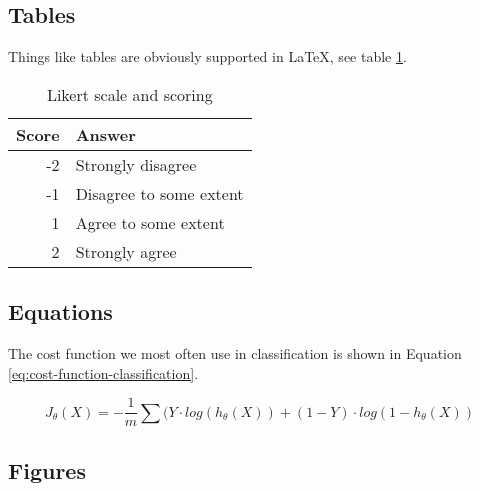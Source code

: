 \documentclass[a4paper, twocolumn]{article}
\begin{document}
\subsection{Tables\label{sec:Tables}}

Things like tables are obviously supported in \LaTeX, see table \ref{table:Likert scale and scoring}.

\begin{table}[ht]
    \caption{Likert scale and scoring}
    \centering
    \begin{tabular}{r | l}
        \hline\hline
        Score & Answer \\ [0.5ex] %
        \hline
        -2 & Strongly disagree \\
        -1 & Disagree to some extent \\
        1 & Agree to some extent \\
        2 & Strongly agree \\ [1ex]
        \hline
    \end{tabular}
    \label{table:Likert scale and scoring}
\end{table}


\subsection{Equations\label{sec:Equations}}

The cost function we most often use in classification is shown in Equation \ref{eq:cost-function-classification}.

\begin{equation}
    \label{eq:cost-function-classification}
    J_\theta(X) = -\frac{1}{m} \sum (Y \cdot log(h_\theta(X)) + (1 - Y) \cdot log(1 - h_\theta(X))
\end{equation}


\subsection{Figures\label{sec:figures}}


\printbibliography
\end{document}
